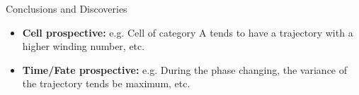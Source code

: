 \documentclass{beamer}
\begin{document}
\begin{frame}{Conclusions and Discoveries}
  \begin{itemize}
    \item \textbf{Cell prospective:} e.g. Cell of category A tends to have a trajectory with a higher winding number, etc.
    \item \textbf{Time/Fate prospective:} e.g. During the phase changing, the variance of the trajectory tends be maximum, etc.
  \end{itemize}
\end{frame}
\end{document}
